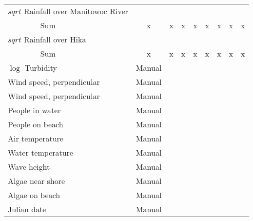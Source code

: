 \begin{table}
{\begin{minipage}{\textwidth}
\begin{tabular}{ll|cccccccc}
        \hline
        \multicolumn{2}{l|}{$sqrt$ Rainfall over Manitowoc River} &&&&&&&& \\
        & Sum & x & x & x & x & x & x & x & x \\
        \hline
        \multicolumn{2}{l|}{$sqrt$ Rainfall over Hika} &&&&&&&& \\
        & Sum & x & x & x & x & x & x & x & x \\
        \hline
        \multicolumn{2}{l|}{$\log$ Turbidity} & Manual &&&&&&& \\
        \hline
        \multicolumn{2}{l|}{Wind speed, perpendicular} & Manual&&&&&&& \\
        \hline
        \multicolumn{2}{l|}{Wind speed, perpendicular} & Manual&&&&&&& \\
        \hline
        \multicolumn{2}{l|}{People in water} & Manual&&&&&&& \\
        \hline
        \multicolumn{2}{l|}{People on beach} & Manual&&&&&&& \\
        \hline
        \multicolumn{2}{l|}{Air temperature} & Manual&&&&&&& \\
        \hline
        \multicolumn{2}{l|}{Water temperature} & Manual&&&&&&& \\
        \hline
        \multicolumn{2}{l|}{Wave height} & Manual&&&&&&& \\
        \hline
        \multicolumn{2}{l|}{Algae near shore} & Manual&&&&&&& \\
        \hline
        \multicolumn{2}{l|}{Algae on beach} & Manual&&&&&&& \\
        \hline
        \multicolumn{2}{l|}{Julian date} & Manual&&&&&&& \\
        \hline
        \end{tabular}
        \end{minipage}}
\end{table}